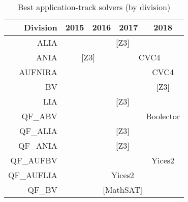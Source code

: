 \newcommand{\nc}[1]{{[}#1{]}}
\begin{table}
  \caption{Best application-track solvers (by division)}
  \label{tab:winners-application}
  \centering
  \begin{tabular}{rcccc}
    \toprule
    Division                         & 2015                          & 2016  & 2017      & 2018      \\ \midrule \cline{2-5}
    \multicolumn{1}{r|}{ALIA}       & \multicolumn{4}{c|}{\nc{Z3}}                    \\ \cline{2-5} 
    \multicolumn{1}{r|}{ANIA}       & \multicolumn{2}{c|}{\nc{Z3}}                                   & \multicolumn{2}{c|}{CVC4}                                      \\ \cline{2-5} 
    AUFNIRA                          &                               &                                 & \multicolumn{1}{l|}{}         & \multicolumn{1}{c|}{CVC4}      \\ \cline{5-5} 
    BV                               &                               &                                 & \multicolumn{1}{l|}{}         & \multicolumn{1}{c|}{\nc{Z3}}  \\ \cline{2-5} 
    \multicolumn{1}{r|}{LIA}        & \multicolumn{4}{c|}{\nc{Z3}}                                                                                                    \\ \cline{2-5} 
    QF\_ABV                          & \multicolumn{1}{l}{}          &                                 & \multicolumn{1}{l|}{}         & \multicolumn{1}{c|}{Boolector} \\ \cline{2-5} 
    \multicolumn{1}{r|}{QF\_ALIA}   & \multicolumn{4}{c|}{\nc{Z3}}                                                                                                    \\ \cline{2-5} 
    \multicolumn{1}{r|}{QF\_ANIA}   & \multicolumn{4}{c|}{\nc{Z3}}                                                                                                    \\ \cline{2-5} 
    QF\_AUFBV                        & \multicolumn{1}{l}{}          &                                 & \multicolumn{1}{l|}{}         & \multicolumn{1}{c|}{Yices2}    \\ \cline{2-5} 
    \multicolumn{1}{r|}{QF\_AUFLIA} & \multicolumn{4}{c|}{Yices2}                                                                                                      \\ \cline{2-5} 
    \multicolumn{1}{r|}{QF\_BV}     & \multicolumn{4}{c|}{\nc{MathSAT}}                                                                                               \\ \cline{2-5} 

\end{tabular}
\end{table}
